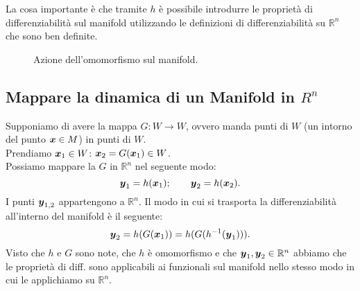 \noindent
La cosa importante è che tramite $h$ è possibile introdurre le proprietà di differenziabilità sul manifold utilizzando le definizioni di differenziabilità su $\mathbb{R}^n$ che sono ben definite.
\begin{figure}[H]
    \centering
    \caption{\scriptsize Azione dell'omomorfismo sul manifold.}
    \label{fig:3_2}
\end{figure}

\subsection{Mappare la dinamica di un Manifold in $R^n$}%
\label{sub:Mappare la dinamica di un Manifold in Rn }
Supponiamo di avere la mappa $G: W\to W$, ovvero manda punti di $W$ (un intorno del punto $\boldsymbol{x}  \in M$) in punti di $W$.\\
Prendiamo $\boldsymbol{x}_1 \in W$: $\boldsymbol{x}_2 = G(\boldsymbol{x}_1)\in W$.\\
Possiamo mappare la $G$ in $\mathbb{R}^n$ nel seguente modo:
\[
    \boldsymbol{y}_1 = h(\boldsymbol{x}_1); \qquad \boldsymbol{y}_2 = h(\boldsymbol{x}_2)
.\] 
I punti $\boldsymbol{y}_{1,2}$ appartengono a $\mathbb{R}^n$. Il modo in cui si trasporta la differenziabilità all'interno del manifold è il seguente:
\[
    \boldsymbol{y}_2 = h(G(\boldsymbol{x}_1)) = h(G(h^{-1}(\boldsymbol{y}_1)))
.\] 
Visto che $h$ e $G$ sono note, che $h$ è omomorfismo e che $\boldsymbol{y}_1, \boldsymbol{y}_2 \in \mathbb{R}^n$ abbiamo che le proprietà di diff. sono applicabili ai funzionali sul manifold nello stesso modo in cui le applichiamo su $\mathbb{R}^n$.

